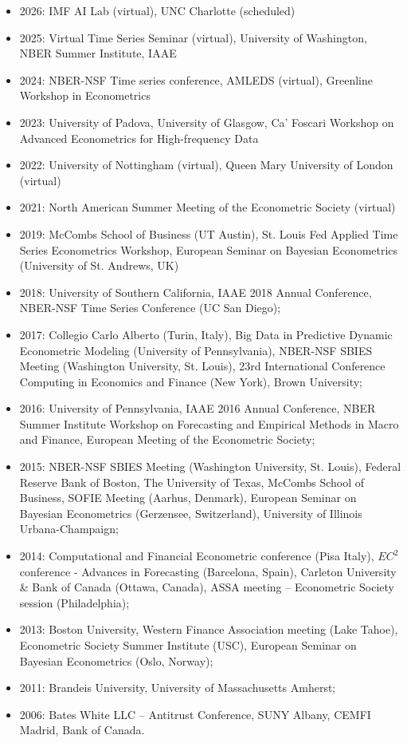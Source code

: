 \documentclass[12pt]{article}
\begin{document}
\begin{itemize}
	\item 2026: IMF AI Lab (virtual), UNC Charlotte (scheduled)
	\item 2025: Virtual Time Series Seminar (virtual), University of Washington, NBER Summer Institute, IAAE
		\item 2024: NBER-NSF Time series conference, AMLEDS (virtual), Greenline Workshop in Econometrics
	\item 2023: University of Padova, University of Glasgow, Ca' Foscari Workshop on Advanced Econometrics for High-frequency Data
	\item 2022: University of Nottingham (virtual), Queen Mary University of London (virtual)
	\item 2021: North American Summer Meeting of the Econometric Society (virtual) 
	\item 2019: McCombs School of Business (UT Austin), St. Louis Fed Applied Time Series Econometrics Workshop, European Seminar on Bayesian Econometrics (University of St. Andrews, UK)
	\item 2018: University of Southern California, IAAE 2018 Annual Conference, NBER-NSF Time Series Conference (UC San Diego);
	\item 2017: Collegio Carlo Alberto (Turin, Italy), Big Data in Predictive Dynamic Econometric Modeling (University of Pennsylvania), NBER-NSF SBIES Meeting (Washington University, St. Louis), 23rd International Conference Computing in Economics and Finance (New York), Brown University;
	\item 2016: University of Pennsylvania, IAAE 2016 Annual Conference, NBER Summer Institute Workshop on Forecasting and Empirical Methods in Macro and Finance, European Meeting of the Econometric Society;
  \item 2015: NBER-NSF SBIES Meeting (Washington University, St. Louis), Federal Reserve Bank of Boston, The University of Texas, McCombs School of Business, SOFIE Meeting (Aarhus, Denmark), European Seminar on Bayesian Econometrics (Gerzensee, Switzerland), University of Illinois Urbana-Champaign;
	\item 2014: Computational and Financial Econometric conference (Pisa Italy), $EC^2$ conference - Advances in Forecasting (Barcelona, Spain),  Carleton University \& Bank of Canada (Ottawa, Canada), ASSA meeting -- Econometric Society session (Philadelphia);  
	\item 2013: Boston University, Western Finance Association meeting (Lake Tahoe), Econometric Society Summer Institute (USC), European Seminar on Bayesian Econometrics (Oslo, Norway); 
	\item 2011: Brandeis University, University of Massachusetts Amherst; 
	\item 2006: Bates White LLC -- Antitrust Conference, SUNY Albany, CEMFI Madrid, Bank of Canada.
\end{itemize}
\end{document}
